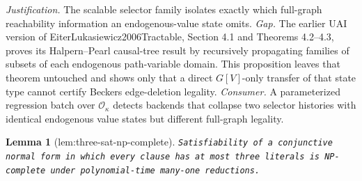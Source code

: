 \documentclass{article}
\newtheorem{lemma}{Lemma}
\begin{document}
\par\smallskip\noindent \textit{Justification.} The scalable selector family isolates exactly which full-graph reachability information an endogenous-value state omits. \textit{Gap.} The earlier UAI version of EiterLukasiewicz2006Tractable, Section 4.1 and Theorems 4.2--4.3, proves its Halpern--Pearl causal-tree result by recursively propagating families of subsets of each endogenous path-variable domain. This proposition leaves that theorem untouched and shows only that a direct \(G[V]\)-only transfer of that state type cannot certify Beckers edge-deletion legality. \textit{Consumer.} A parameterized regression batch over \(\mathcal O_{\kappa}\) detects backends that collapse two selector histories with identical endogenous value states but different full-graph legality.

\begin{lemma}[lem:three-sat-np-complete]\label{lem:three-sat-np-complete}
\texttt{Satisfiability of a conjunctive normal form in which every clause has at most three literals is NP-\allowbreak{}complete under polynomial-\allowbreak{}time many-\allowbreak{}one reductions.}
\end{lemma}
\end{document}
